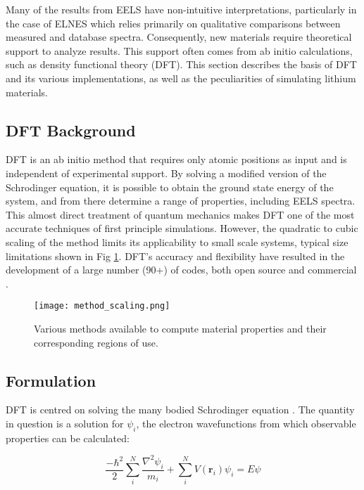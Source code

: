 

 


Many of the results from EELS have non-intuitive interpretations, particularly in the case of ELNES which relies primarily on qualitative comparisons between measured and database spectra.  Consequently, new materials require theoretical support to analyze results.  This support often comes from ab initio calculations, such as density functional theory (DFT).  This section  describes the basis of DFT and its various implementations, as well as the peculiarities of simulating lithium materials.

\subsection{DFT Background}
DFT is an ab initio method that requires only atomic positions as input and is independent of experimental support.  By solving a modified version of the Schrodinger equation, it is possible to obtain the ground state energy of the system, and from there determine a range of  properties, including EELS spectra. This almost direct treatment of quantum mechanics makes DFT one of the most accurate techniques of first principle simulations. However, the quadratic to cubic scaling of the method limits its applicability to small scale systems, typical size limitations shown in Fig \ref{scaling}.  DFT's accuracy and flexibility have resulted in the development of a large number (90+) of codes, both open source and commercial \cite{DFT_codes}.  

\begin{figure}
	\centering
	\texttt{[image: method\_scaling.png]}
	\caption{Various methods available to compute material properties and their corresponding regions of use. }
	\label{scaling}
\end{figure}


\subsection{Formulation}

DFT is centred  on solving the many bodied  Schrodinger equation \cite{sholl_density_2009}.  The quantity in question is a solution for $\psi_i$, the electron wavefunctions from which observable properties can be calculated:  

\begin{equation}
	\frac{-\hbar^2}{2} \sum_{i}^{N} \frac{\nabla^2 \psi_i}{m_i} + \sum_{i}^{N} V(\textbf{r}_i) \psi_i = E \psi
\end{equation}


